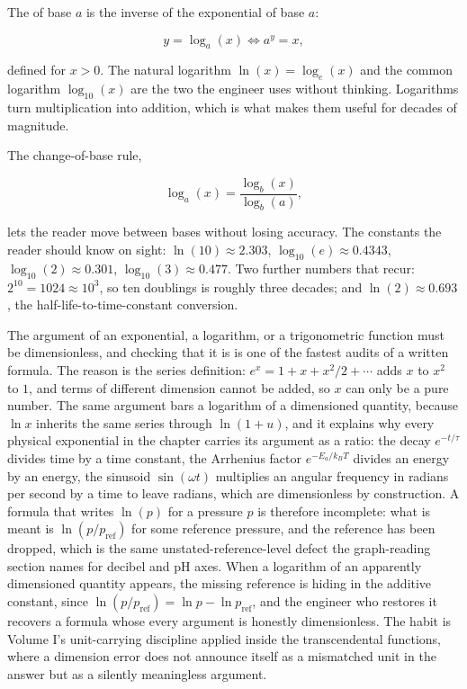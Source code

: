 The  of base $a$ is the inverse of the
exponential of base $a$:

\[
y = \log_{a}(x) \iff a^{y} = x,
\]

defined for $x > 0$. The natural logarithm $\ln(x) = \log_{e}(x)$
and the common logarithm $\log_{10}(x)$ are the two the engineer
uses without thinking. Logarithms turn multiplication into addition,
which is what makes them useful for decades of magnitude.

The change-of-base rule,

\[
\log_{a}(x) = \frac{\log_{b}(x)}{\log_{b}(a)},
\]

lets the reader move between bases without losing accuracy. The
constants the reader should know on sight: $\ln(10) \approx 2.303$,
$\log_{10}(e) \approx 0.4343$, $\log_{10}(2) \approx 0.301$,
$\log_{10}(3) \approx 0.477$. Two further numbers that recur:
$2^{10} = 1024 \approx 10^{3}$, so ten doublings is roughly three
decades; and $\ln(2) \approx 0.693$, the half-life-to-time-constant
conversion.

\begin{mastery}
The argument of an exponential, a logarithm, or a trigonometric
function must be dimensionless, and checking that it is is one of the
fastest audits of a written formula. The reason is the series
definition: $e^{x} = 1 + x + x^2/2 + \cdots$ adds $x$ to $x^2$ to $1$,
and terms of different dimension cannot be added, so $x$ can only be a
pure number. The same argument bars a logarithm of a dimensioned
quantity, because $\ln x$ inherits the same series through
$\ln(1 + u)$, and it explains why every physical exponential in the
chapter carries its argument as a ratio: the decay $e^{-t/\tau}$
divides time by a time constant, the Arrhenius factor
$e^{-E_a/k_B T}$ divides an energy by an energy, the sinusoid
$\sin(\omega t)$ multiplies an angular frequency in radians per second
by a time to leave radians, which are dimensionless by construction. A
formula that writes $\ln(p)$ for a pressure $p$ is therefore
incomplete: what is meant is $\ln(p/p_{\text{ref}})$ for some reference
pressure, and the reference has been dropped, which is the same
unstated-reference-level defect the graph-reading section names for
decibel and pH axes. When a logarithm of an apparently dimensioned
quantity appears, the missing reference is hiding in the additive
constant, since $\ln(p/p_{\text{ref}}) = \ln p - \ln p_{\text{ref}}$,
and the engineer who restores it recovers a formula whose every
argument is honestly dimensionless. The habit is Volume I's
unit-carrying discipline applied inside the transcendental functions,
where a dimension error does not announce itself as a mismatched unit
in the answer but as a silently meaningless argument.
\end{mastery}

